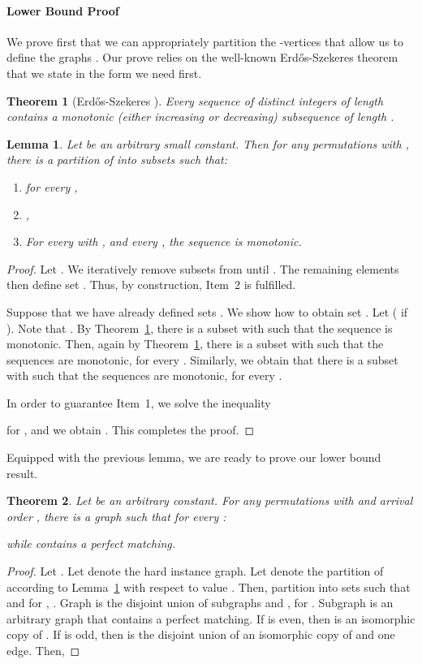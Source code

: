 \documentclass[a4paper]{article}
\newtheorem{theorem}{Theorem}
\newtheorem{lemma}{Lemma}
\begin{document}
\paragraph*{Lower Bound Proof}
We prove first that we can appropriately partition the -vertices that allow us to define the
graphs . Our prove relies on the well-known Erd\H{o}s-Szekeres theorem \cite{es87} that we state in the
form we need first.

\begin{theorem}[Erd\H{o}s-Szekeres \cite{es87}] \label{thm:es}
 Every sequence of distinct integers of length  contains a monotonic (either increasing or
 decreasing) subsequence of length .
\end{theorem}



\begin{lemma} \label{lem:decomp}
Let  be an arbitrary small constant. Then for any  permutations
 with
,
there is a partition of  into subsets  such that:
\begin{enumerate}
 \item  for every ,
 \item ,
 \item For every  with , and every , the sequence
 is monotonic.
\end{enumerate}
\end{lemma}
\begin{proof}
 Let . We iteratively remove subsets  from  until . The remaining elements then define
 set . Thus, by construction, Item~2 is fulfilled.


 Suppose that we have already defined sets . We show how to obtain set .
 Let  ( if ). Note that .
 By Theorem~\ref{thm:es}, there is a
 subset 
 with  such that the sequence
  is monotonic. Then, again by Theorem~\ref{thm:es}, there is
 a subset  with 
 such that the sequences  are monotonic, for every . Similarly,
 we obtain that there is a subset  with
  such that the sequences
  are monotonic, for every .

 In order to guarantee Item~1, we solve the inequality
 
for , and we obtain . This completes the proof.
\end{proof}

Equipped with the previous lemma, we are ready to prove our lower bound result.
\begin{theorem} \label{thm:lb-ranking}
 Let  be an arbitrary constant. For any 
 permutations  with
 and arrival order ,
there is a graph  such that for every :

while  contains a perfect matching.
\end{theorem}
\begin{proof}
Let .
Let  denote the hard instance graph.
Let  denote the partition of  according to Lemma~\ref{lem:decomp} with
respect to value .
Then, partition  into sets  such that  and for
,  . Graph  is the disjoint union of subgraphs
 and , for . Subgraph 
is an arbitrary graph that contains a perfect matching. If  is even, then
 is an isomorphic copy of . If  is odd, then
 is the disjoint union of an isomorphic copy of  and one edge.
Then,
 
\end{proof}
\end{document}
